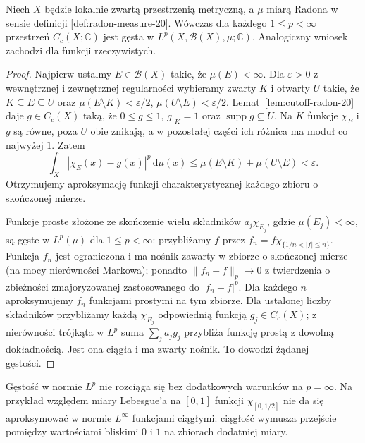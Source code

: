 \begin{twierdzenie}
\label{thm:cc-dense-lp-radon-20}
Niech $X$ będzie lokalnie zwartą przestrzenią metryczną,
a $\mu$ miarą Radona w sensie definicji
\ref{def:radon-measure-20}. Wówczas dla każdego
$1\le p<\infty$ przestrzeń $C_c(X;\mathbb C)$ jest
gęsta w $L^p(X,\mathcal B(X),\mu;\mathbb C)$.
Analogiczny wniosek zachodzi dla funkcji rzeczywistych.
\end{twierdzenie}
\begin{proof}
Najpierw ustalmy $E\in\mathcal B(X)$ takie, że
$\mu(E)<\infty$. Dla $\varepsilon>0$ z wewnętrznej
i zewnętrznej regularności wybieramy zwarty $K$
i otwarty $U$ takie, że
$K\subseteq E\subseteq U$ oraz
$\mu(E\setminus K)<\varepsilon/2$,
$\mu(U\setminus E)<\varepsilon/2$.
Lemat~\ref{lem:cutoff-radon-20} daje $g\in C_c(X)$
taką, że $0\le g\le1$, $g|_K=1$ oraz
$\operatorname{supp}g\subseteq U$.
Na $K$ funkcje $\chi_E$ i $g$ są równe, poza $U$
obie znikają, a w pozostałej części ich różnica
ma moduł co najwyżej $1$. Zatem
\[
 \int_X|\chi_E(x)-g(x)|^p\,\mathrm d\mu(x)
 \le\mu(E\setminus K)+\mu(U\setminus E)
 <\varepsilon.
\]
Otrzymujemy aproksymację funkcji charakterystycznej
każdego zbioru o skończonej mierze.

Funkcje proste złożone ze skończenie wielu składników
$a_j\chi_{E_j}$, gdzie $\mu(E_j)<\infty$, są gęste
w $L^p(\mu)$ dla $1\le p<\infty$:
przybliżamy $f$ przez
$f_n=f\chi_{\{1/n<|f|\le n\}}$.
Funkcja $f_n$ jest ograniczona i ma nośnik
zawarty w zbiorze o skończonej mierze
(na mocy nierówności Markowa); ponadto
$\|f_n-f\|_p\to0$ z twierdzenia o zbieżności
zmajoryzowanej zastosowanego do $|f_n-f|^p$.
Dla każdego $n$ aproksymujemy $f_n$
funkcjami prostymi na tym zbiorze.
Dla ustalonej liczby składników przybliżamy
każdą $\chi_{E_j}$ odpowiednią funkcją $g_j\in C_c(X)$;
z nierówności trójkąta w $L^p$ suma
$\sum_ja_jg_j$ przybliża funkcję prostą z dowolną
dokładnością. Jest ona ciągła i ma zwarty nośnik.
To dowodzi żądanej gęstości.
\end{proof}

\begin{uwaga}
Gęstość w normie $L^p$ nie rozciąga się bez dodatkowych
warunków na $p=\infty$. Na przykład względem miary
Lebesgue'a na $[0,1]$ funkcji $\chi_{[0,1/2]}$
nie da się aproksymować w normie $L^\infty$
funkcjami ciągłymi: ciągłość wymusza przejście pomiędzy
wartościami bliskimi $0$ i $1$ na zbiorach dodatniej miary.
\end{uwaga}

